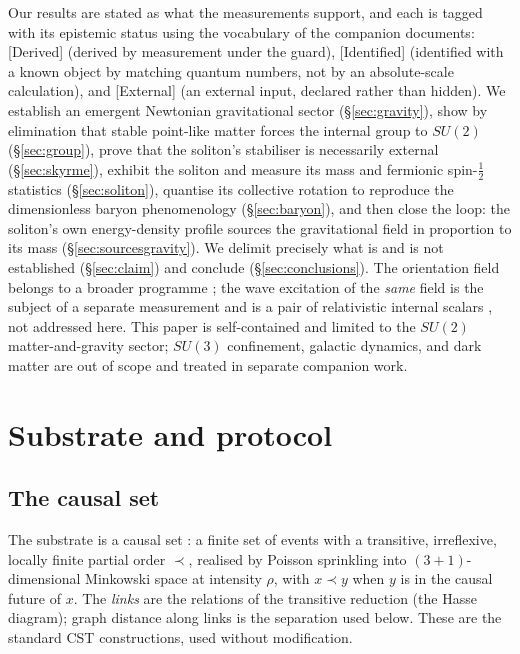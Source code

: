 \documentclass[aps,prd,reprint,nofootinbib,superscriptaddress,floatfix]{revtex4-2}
\theoremstyle{plain}
\newcommand{\Sderiv}{\textsf{[Derived]}}
\newcommand{\Sident}{\textsf{[Identified]}}
\newcommand{\Sext}{\textsf{[External]}}
\newcommand{\su}[1]{SU(#1)}
\begin{document}
Our results are stated as what the measurements support, and each is tagged with its
epistemic status using the vocabulary of the companion documents: \Sderiv{} (derived
by measurement under the guard), \Sident{} (identified with a known object by
matching quantum numbers, not by an absolute-scale calculation), and \Sext{}
(an external input, declared rather than hidden). We establish an emergent Newtonian
gravitational sector (\S\ref{sec:gravity}), show by elimination that stable
point-like matter forces the internal group to $\su2$ (\S\ref{sec:group}), prove
that the soliton's stabiliser is necessarily external (\S\ref{sec:skyrme}), exhibit
the soliton and measure its mass and fermionic spin-$\tfrac12$ statistics
(\S\ref{sec:soliton}), quantise its collective rotation to reproduce the dimensionless
baryon phenomenology (\S\ref{sec:baryon}), and then close the loop: the soliton's own
energy-density profile sources the gravitational field in proportion to its mass
(\S\ref{sec:sourcesgravity}). We delimit precisely
what is and is not established (\S\ref{sec:claim}) and conclude
(\S\ref{sec:conclusions}). The orientation field belongs to a broader programme
\cite{TEICDoc1}; the wave excitation of the \emph{same} field is the subject of a
separate measurement and is a pair of relativistic internal scalars
\cite{GoldstonePRD}, not addressed here. This paper is self-contained and limited to
the $\su2$ matter-and-gravity sector; $\su3$ confinement, galactic dynamics, and
dark matter are out of scope and treated in separate companion work.

\section{Substrate and protocol}\label{sec:protocol}

\subsection{The causal set}
The substrate is a causal set \cite{BLMS1987}: a finite set of events with a
transitive, irreflexive, locally finite partial order $\prec$, realised by Poisson
sprinkling into $(3{+}1)$-dimensional Minkowski space at intensity $\rho$, with
$x\prec y$ when $y$ is in the causal future of $x$. The \emph{links} are the
relations of the transitive reduction (the Hasse diagram); graph distance along
links is the separation used below. These are the standard CST constructions, used
without modification.
\end{document}
